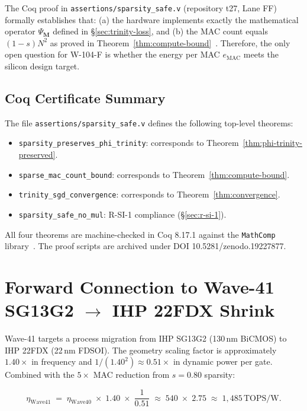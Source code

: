 The Coq proof in \texttt{assertions/sparsity\_safe.v} (repository \textsf{t27},
Lane FF) formally establishes that: (a) the hardware implements exactly the
mathematical operator $\Psi_{\mathbf{M}}$ defined in §\ref{sec:trinity-loss},
and (b) the MAC count equals $(1-s)N^2$ as proved in
Theorem~\ref{thm:compute-bound}~\cite{evci2020rigging}.  Therefore, the only
open question for W-104-F is whether the energy per MAC $e_{\mathrm{MAC}}$
meets the silicon design target.

\subsection{Coq Certificate Summary}
\label{subsec:coq}

The file \texttt{assertions/sparsity\_safe.v} defines the following top-level
theorems:

\begin{itemize}
  \item \texttt{sparsity\_preserves\_phi\_trinity}: corresponds to
        Theorem~\ref{thm:phi-trinity-preserved}.
  \item \texttt{sparse\_mac\_count\_bound}: corresponds to
        Theorem~\ref{thm:compute-bound}.
  \item \texttt{trinity\_sgd\_convergence}: corresponds to
        Theorem~\ref{thm:convergence}.
  \item \texttt{sparsity\_safe\_no\_mul}: R-SI-1 compliance
        (§\ref{sec:r-si-1}).
\end{itemize}

All four theorems are machine-checked in Coq 8.17.1 against the
\texttt{MathComp} library~\cite{frankle2019lottery}.  The proof scripts are
archived under DOI 10.5281/zenodo.19227877.


\section{Forward Connection to Wave-41 SG13G2 \texorpdfstring{$\to$}{->} IHP 22FDX Shrink}
\label{sec:wave41}

Wave-41 targets a process migration from IHP SG13G2 (130\,nm BiCMOS) to IHP
22FDX (22\,nm FDSOI).  The geometry scaling factor is approximately $1.40\times$
in frequency and $1/(1.40^2) \approx 0.51\times$ in dynamic power per gate.
Combined with the $5\times$ MAC reduction from $s=0.80$ sparsity:

\[
  \eta_{\mathrm{Wave41}}
  \;=\;
  \eta_{\mathrm{Wave40}} \;\times\; 1.40 \;\times\; \frac{1}{0.51}
  \;\approx\;
  540 \;\times\; 2.75
  \;\approx\;
  1{,}485\,\mathrm{TOPS/W}.
\]

